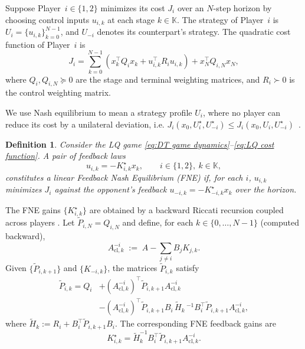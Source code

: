 \documentclass[letterpaper, 10 pt, conference]{ieeeconf}  %
\newtheorem{definition}{\textbf{Definition}}
\begin{document}
Suppose Player~$i \in \{1,2\}$ minimizes its cost $J_i$ over an $N$-step horizon by choosing control inputs $u_{i,k}$ at each stage $k \in \mathbb{K}$. The strategy of Player~$i$ is $U_i = \{u_{i,k}\}_{k=0}^{N-1}$, and $U_{-i}$ denotes its counterpart’s strategy. The quadratic cost function of Player~$i$ is
\begin{equation}
    \label{eq:LQ cost function}
    J_i = \sum_{k=0}^{N-1} \left( x_k^\top Q_i x_k + u_{i,k}^\top R_i u_{i,k} \right) + x_N^\top Q_{i,N} x_N,
\end{equation}
where $Q_i, Q_{i,N} \succeq 0$ are the stage and terminal weighting matrices, and $R_i \succ 0$ is the control weighting matrix.

We use Nash equilibrium to mean a strategy profile $U_i$, where no player can reduce its cost by a unilateral deviation, i.e. $ J_i(x_0, U_i^\star, U_{-i}^\star) \le J_i(x_0, U_i, U_{-i}^\star)$~\cite{nash1950equilibrium}.
\begin{definition}
\label{def: definition of Nash}
Consider the LQ game \eqref{eq:DT game dynamics}–\eqref{eq:LQ cost function}.  
A pair of feedback laws
\[
u_{i,k}=-K^\star_{i,k}x_k,\qquad i\in\{1,2\},\ k\in\mathbb{K},
\]
constitutes a linear Feedback Nash Equilibrium (FNE) if, for each $i$, $u_{i,k}$ minimizes $J_i$ against the opponent’s feedback $u_{-i,k}=-K^\star_{-i,k}x_k$ over the horizon.
\end{definition}

The FNE gains $\{K^\star_{i,k}\}$ are obtained by a backward Riccati recursion coupled across players \cite{salizzoni2025bridging}.  
Let $\tilde P_{i,N}=Q_{i,N}$ and define, for each $k\in\{0,\dots,N-1\}$ (computed backward),
\[
A^{-i}_{\mathrm{cl},k} \;:=\; A-\sum_{j\neq i} B_j K_{j,k}.
\]
Given $\{\tilde P_{i,k+1}\}$ and $\{K_{-i,k}\}$, the matrices $\tilde P_{i,k}$ satisfy
\begin{equation}
\label{eq:coupled_riccati-nominal}
\begin{aligned}
\tilde P_{i,k}
= Q_i &+ (A^{-i}_{\mathrm{cl},k})^\top \tilde P_{i,k+1} A^{-i}_{\mathrm{cl},k}\\
&- (A^{-i}_{\mathrm{cl},k})^\top \tilde P_{i,k+1} B_i
\,\tilde H_k\,^{-1}\!
B_i^\top \tilde P_{i,k+1} A^{-i}_{\mathrm{cl},k},
\end{aligned}
\end{equation}
where $\tilde H_k :=R_i + B_i^\top \tilde P_{i,k+1} B_i$. The corresponding FNE feedback gains are
\begin{equation}
\label{eq:Ki_formula-nominal}
K^\star_{i,k}
= \tilde H_k^{-1} B_i^\top \tilde P_{i,k+1} A^{-i}_{\mathrm{cl},k}.
\end{equation}
\end{document}

